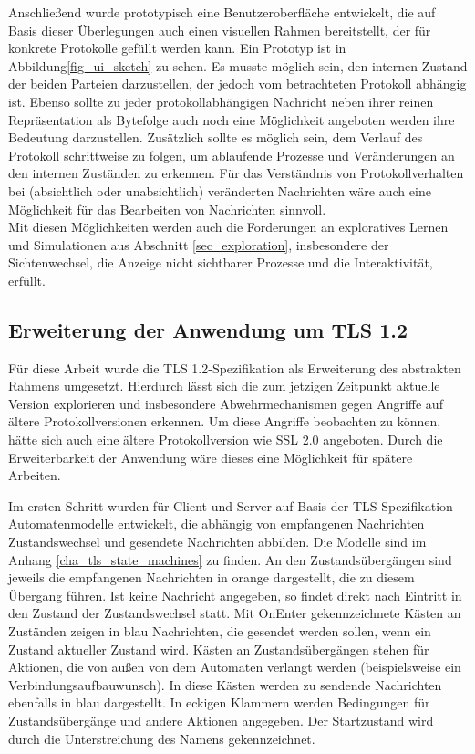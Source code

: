Anschließend wurde prototypisch eine Benutzeroberfläche entwickelt, die auf Basis dieser Überlegungen auch einen visuellen Rahmen bereitstellt, der für konkrete Protokolle gefüllt werden kann. Ein Prototyp ist in Abbildung\ref{fig_ui_sketch} zu sehen. Es musste möglich sein, den internen Zustand der beiden Parteien darzustellen, der jedoch vom betrachteten Protokoll abhängig ist. Ebenso sollte zu jeder protokollabhängigen Nachricht neben ihrer reinen Repräsentation als Bytefolge auch noch eine Möglichkeit angeboten werden ihre Bedeutung darzustellen. Zusätzlich sollte es möglich sein, dem Verlauf des Protokoll schrittweise zu folgen, um ablaufende Prozesse und Veränderungen an den internen Zuständen zu erkennen. Für das Verständnis von Protokollverhalten bei (absichtlich oder unabsichtlich) veränderten Nachrichten wäre auch eine Möglichkeit für das Bearbeiten von Nachrichten sinnvoll.\\
Mit diesen Möglichkeiten werden auch die Forderungen an exploratives Lernen und Simulationen aus Abschnitt \ref{sec_exploration}, insbesondere der Sichtenwechsel, die Anzeige nicht sichtbarer Prozesse und die Interaktivität, erfüllt.

\subsection{Erweiterung der Anwendung um TLS 1.2}

Für diese Arbeit wurde die TLS 1.2-Spezifikation als Erweiterung des abstrakten Rahmens umgesetzt. Hierdurch lässt sich die zum jetzigen Zeitpunkt aktuelle Version explorieren und insbesondere Abwehrmechanismen gegen Angriffe auf ältere Protokollversionen erkennen. Um diese Angriffe beobachten zu können, hätte sich auch eine ältere Protokollversion wie SSL 2.0 angeboten. Durch die Erweiterbarkeit der Anwendung wäre dieses eine Möglichkeit für spätere Arbeiten.

Im ersten Schritt wurden für Client und Server auf Basis der TLS-Spezifikation Automatenmodelle entwickelt, die abhängig von empfangenen Nachrichten Zustandswechsel und gesendete Nachrichten abbilden. Die Modelle sind im Anhang \ref{cha_tls_state_machines} zu finden. An den Zustandsübergängen sind jeweils die empfangenen Nachrichten in orange dargestellt, die zu diesem Übergang führen. Ist keine Nachricht angegeben, so findet direkt nach Eintritt in den Zustand der Zustandswechsel statt. Mit OnEnter gekennzeichnete Kästen an Zuständen zeigen in blau Nachrichten, die gesendet werden sollen, wenn ein Zustand aktueller Zustand wird. Kästen an Zustandsübergängen stehen für Aktionen, die von außen von dem Automaten verlangt werden (beispielsweise ein Verbindungsaufbauwunsch). In diese Kästen werden zu sendende Nachrichten ebenfalls in blau dargestellt. In eckigen Klammern werden Bedingungen für Zustandsübergänge und andere Aktionen angegeben. Der Startzustand wird durch die Unterstreichung des Namens gekennzeichnet.
 
